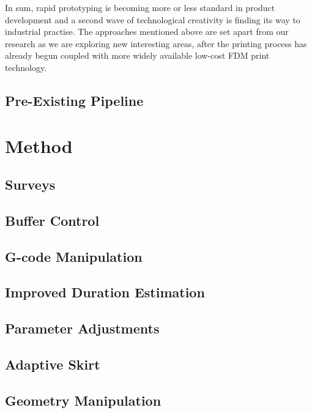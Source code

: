 \documentclass[11pt]{article} %
\begin{document}
In sum, rapid prototyping is becoming more or less standard in product development and a second wave of technological creativity is finding its way to industrial practise. The approaches mentioned above are set apart from our research as we are exploring new interesting areas, after the printing process has already begun coupled with more widely available low-cost FDM print technology. 


\subsection{Pre-Existing Pipeline}




\section{Method}
\subsection{Surveys}


\subsection{Buffer Control}



\subsection{G-code Manipulation}



\subsection{Improved Duration Estimation}



\subsection{Parameter Adjustments}



\subsection{Adaptive Skirt}



\subsection{Geometry Manipulation}
\end{document}
